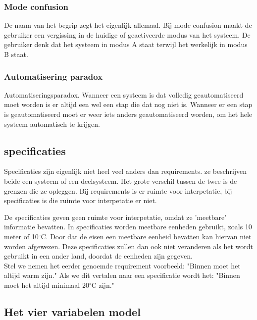 \documentclass{article}%
\begin{document}
\subsubsection{Mode confusion}
De naam van het begrip zegt het eigenlijk allemaal. Bij mode confusion maakt de gebruiker een vergissing in de huidige of geactiveerde modus van het systeem. De gebruiker denk dat het systeem in modus A staat terwijl het werkelijk in modus B staat. 

\subsubsection{Automatisering paradox}
Automatiseringsparadox. Wanneer een systeem is dat volledig geautomatiseerd moet worden is er altijd een wel een stap die dat nog niet is. Wanneer er een stap is geautomatiseerd moet er weer iets anders geautomatiseerd worden, om het hele systeem automatisch te krijgen.

\subsection{specificaties}
Specificaties zijn eigenlijk niet heel veel anders dan requirements. ze beschrijven beide een systeem of een deelsysteem. Het grote verschil tussen de twee is de grenzen die ze opleggen. Bij requirements is er ruimte voor interpetatie, bij specificaties is die ruimte voor interpetatie er niet.

De specificaties geven geen ruimte voor interpetatie, omdat ze 'meetbare' informatie bevatten. In specificaties worden meetbare eenheden gebruikt, zoals 10 meter of 10$^{\circ}$C. Door dat de eisen een meetbare eenheid bevatten kan hiervan niet worden afgewezen. Deze specificaties zullen dan ook niet veranderen als het wordt gebruikt in een ander land, doordat de eenheden zijn gegeven.
\\

Stel we nemen het eerder genoemde requirement voorbeeld: "Binnen moet het altijd warm zijn." Als we dit vertalen naar een specificatie wordt het: "Binnen moet het altijd minimaal 20$^{\circ}$C zijn."

\clearpage
\subsection{Het vier variabelen model}
\end{document}
